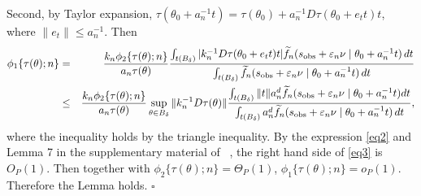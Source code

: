 \documentclass[9pt]{article}
\theoremstyle{remark}
\begin{document}
	Second, by Taylor expansion, $\tau(\theta_0+a_{n}^{-1}t)=\tau(\theta_0)+a_{n}^{-1}D\tau(\theta_0+e_{t}t)t$,
	where $\|e_{t}\|\leq a_{n}^{-1}$. Then 
	\begin{eqnarray}
	\phi_{1}\{\tau(\theta);n\} & = & \frac{k_{n}\phi_{2}\{\tau(\theta);n\}}{a_{n}\tau(\theta)}\frac{\int_{t(B_{\delta})}|k_{n}^{-1}D\tau(\theta_0+e_{t}t)t|\widetilde{f}_{n}(s_{{\rm obs}}+\varepsilon_{n}\nu\mid\theta_0+a_{n}^{-1}t)\,dt}{\int_{t(B_{\delta})}\widetilde{f}_{n}(s_{{\rm obs}}+\varepsilon_{n}\nu\mid\theta_0+a_{n}^{-1}t)\,dt}\nonumber \\
	& \leq & \frac{k_{n}\phi_{2}\{\tau(\theta);n\}}{a_{n}\tau(\theta)}\sup_{\theta\in B_{\delta}}\|k_{n}^{-1}D\tau(\theta)\|\frac{\int_{t(B_{\delta})}\|t\|a_{n}^{d}\widetilde{f}_{n}(s_{{\rm obs}}+\varepsilon_{n}\nu\mid\theta_0+a_{n}^{-1}t)dt}{\int_{t(B_{\delta})}a_{n}^{d}\widetilde{f}_{n}(s_{{\rm obs}}+\varepsilon_{n}\nu\mid\theta_0+a_{n}^{-1}t)\,dt},\label{eq3}
	\end{eqnarray}
	where the inequality holds by the triangle inequality. By the expression
	\eqref{eq2} and Lemma 7 in the supplementary material of ~\cite{Li2016},
	the right hand side of \eqref{eq3} is $O_{P}(1)$. Then together
	with $\phi_{2}\{\tau(\theta);n\}=\Theta_{P}(1)$, $\phi_{1}\{\tau(\theta);n\}=o_{P}(1).$
	Therefore the Lemma holds.
	\hfill{$\square$} 

\pagebreak 
\end{document}
